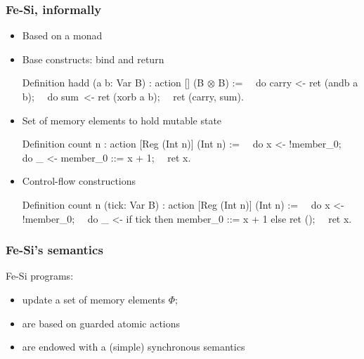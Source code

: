 \documentclass[9pt]{beamer}
\newcommand\fesi{Fe-Si}
\begin{document}
\begin{frame}[fragile]
  \frametitle{Fe-Si, informally}
  \begin{itemize}
  \item Based on a \alert{monad}
  \item Base constructs: bind and return
    \begin{coq}
Definition hadd (a b: Var B) : action [] (B $\otimes$ B) :=
$\quad$do carry <- ret (andb a b); 
$\quad$do sum   $\,$<- ret (xorb a b);
$\quad$ret (carry, sum).  
\end{coq}
\pause
\item Set of memory elements to hold mutable state
\begin{coq}
Definition count n : action [Reg (Int n)] (Int n) :=
$\quad$do x <- !member_0;
$\quad$do _ <- member_0 ::= x + 1;
$\quad$ret x. 
\end{coq}
\pause
\item Control-flow constructions
\begin{coq}
Definition count n (tick: Var B) : action [Reg (Int n)] (Int n) :=
$\quad$do x <- !member_0;
$\quad$do _ <- if tick then {member_0 ::= x + 1} else {ret ()}; 
$\quad$ret x. 
\end{coq}
  \end{itemize}
\end{frame}

\begin{frame}[fragile]
  \frametitle{Fe-Si's semantics}

  \fesi{} programs:
  \begin{itemize}
  \item update a set of \alert{memory elements} $\Phi$;
    \\
  \item are based on \alert{guarded atomic actions} 
    \\
    \begin{center}
    \end{center}
  \item are endowed with a (simple) \alert{synchronous semantics}
    \\
    \begin{center}
    \end{center}
  \end{itemize}
\end{frame}
\end{document}
